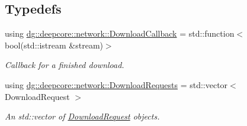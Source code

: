 \subsection*{Typedefs}
\begin{DoxyCompactItemize}
\item 
using \hyperlink{group___network_module_ga4d618c88e9b1e6e961f70621dc9aab41}{dg\+::deepcore\+::network\+::\+Download\+Callback} = std\+::function$<$ bool(std\+::istream \&stream)$>$
\begin{DoxyCompactList}\small\item\em Callback for a finished download. \end{DoxyCompactList}\item 
using \hyperlink{group___network_module_ga6a460317d5e2b04bbaa2bb5389ca2ce3}{dg\+::deepcore\+::network\+::\+Download\+Requests} = std\+::vector$<$ Download\+Request $>$
\begin{DoxyCompactList}\small\item\em An std\+::vector of \hyperlink{structdg_1_1deepcore_1_1network_1_1_download_request}{Download\+Request} objects. \end{DoxyCompactList}\end{DoxyCompactItemize}
